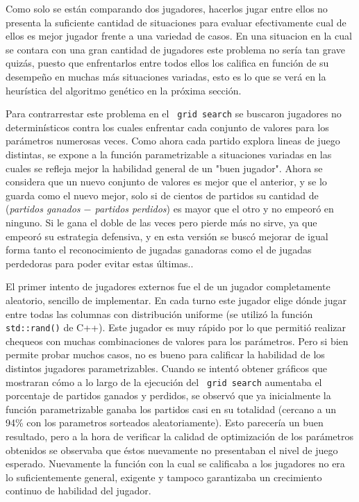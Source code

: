 \documentclass[A4paper,oneside,fleqn,11pt]{article}
\theoremstyle{definition}
\begin{document}
Como solo se están comparando dos jugadores, hacerlos jugar entre ellos no presenta la suficiente cantidad de situaciones para evaluar efectivamente cual de ellos es mejor jugador frente a una variedad de casos. En una situacion en la cual se contara con una gran cantidad de jugadores este problema no sería tan grave quizás, puesto que enfrentarlos entre todos ellos los califica en función de su desempeño en muchas más situaciones variadas, esto es lo que se verá en la heurística del algoritmo genético en la próxima sección.

Para contrarrestar este problema en el \texttt{ grid search} se buscaron jugadores no determinísticos contra los cuales enfrentar cada conjunto de valores para los parámetros numerosas veces. Como ahora cada partido explora lineas de juego distintas, se expone a la función parametrizable a situaciones variadas en las cuales se refleja mejor la habilidad general de un "buen jugador". Ahora se considera que un nuevo conjunto de valores es mejor que el anterior, y se lo guarda como el nuevo mejor, solo si de cientos de partidos su cantidad de (\textit{partidos ganados $-$ partidos perdidos}) es mayor que el otro y no empeoró en ninguno. Si le gana el doble de las veces pero pierde más no sirve, ya que empeoró su estrategia defensiva, y en esta versión se buscó mejorar de igual forma tanto el reconocimiento de jugadas ganadoras como el de jugadas perdedoras para poder evitar estas últimas..

El primer intento de jugadores externos fue el de un jugador completamente aleatorio, sencillo de implementar. En cada turno este jugador elige dónde jugar entre todas las columnas con distribución uniforme (se utilizó la función\texttt{ std::rand()} de C++). Este jugador es muy rápido por lo que permitió realizar chequeos con muchas combinaciones de valores para los parámetros. Pero si bien permite probar muchos casos, no es bueno para calificar la habilidad de los distintos jugadores parametrizables. Cuando se intentó obtener gráficos que mostraran cómo a lo largo de la ejecución del \texttt{ grid search} aumentaba el porcentaje de partidos ganados y perdidos, se observó que ya inicialmente la función parametrizable ganaba los partidos casi en su totalidad (cercano a un 94\% con los parametros sorteados aleatoriamente). Esto parecería un buen resultado, pero a la hora de verificar la calidad de optimización de los parámetros obtenidos se observaba que éstos nuevamente no presentaban el nivel de juego esperado. Nuevamente la función con la cual se calificaba a los jugadores no era lo suficientemente general, exigente y tampoco garantizaba un crecimiento continuo de habilidad del jugador. 
\end{document}
